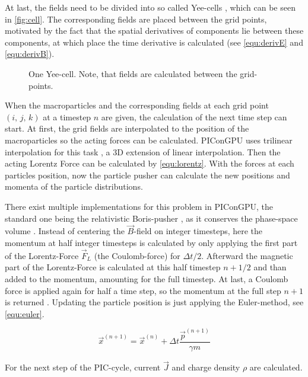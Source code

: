 \documentclass[bachelor_thesis]{subfiles}
\begin{document}
At last, the fields need to be divided into so called Yee-cells \cite{Yee1966}, which can be seen in \autoref{fig:cell}. The corresponding fields are placed between the grid points, motivated by the fact that the spatial derivatives of components lie between these components, 
at which place the time derivative is calculated (see \autoref{equ:derivE} and \autoref{equ:derivB}).

\begin{figure}
	\centering
	\missingfigure{}
	\caption{One Yee-cell. Note, that fields are calculated between the grid-points.}
	\label{fig:cell}
\end{figure}

When the macroparticles and the corresponding fields at each grid point $(i, \, j, \,k)$ at a timestep $n$ are given, the calculation of the next time step can start.
At first, the grid fields are interpolated to the position of the macroparticles so the acting forces can be calculated. PIConGPU uses trilinear interpolation for this task \cite{Huebl2019, PICRepo}, a 3D extension of linear interpolation.
Then the acting Lorentz Force can be calculated by \autoref{equ:lorentz}. With the forces at each particles position, now the particle pusher can calculate the new positions and momenta of the particle distributions.

There exist multiple implementations for this problem in PIConGPU, the standard one being the relativistic Boris-pusher \cite{Boris1970}, as it conserves the phase-space volume \cite{PICRepo}. Instead of centering the $\vec{B}$-field on integer timesteps, here the momentum at half integer timesteps is
calculated by only applying the first part of the Lorentz-Force $\vec{F}_L$ (the Coulomb-force) for $\Delta t/2$. Afterward the magnetic part of the Lorentz-Force is calculated at this half timestep $n+1/2$ and than added to the momentum, amounting for the full timestep.
At last, a Coulomb force is applied again for half a time step, so the momentum at the full step $n+1$ is returned \cite{Zenitani2018, Pausch2019}. Updating the particle position is just applying the Euler-method, see \autoref{equ:euler}.

\begin{equation}
	\vec{x}^{(n+1)} = \vec{x}^{(n)} + \Delta t \frac{\vec{p}^{(n+1)}}{\gamma m}
	\label{equ:euler}
\end{equation}

For the next step of the PIC-cycle, current $\vec{J}$ and charge density $\rho$ are calculated. 
\end{document}
